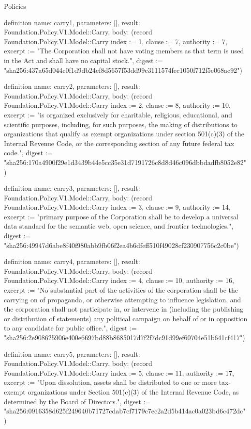 \begin{lexlean}{Policies}
\begin{semanticmodule}
definition{
  name: carry1,
  parameters: [],
  result: Foundation.Policy.V1.Model::Carry,
  body: (record Foundation.Policy.V1.Model::Carry {index := 1, clause := 7, authority := 7, excerpt := "The Corporation shall not have voting members as that term is used in the Act and shall have no capital stock.", digest := "sha256:437a65d044c0f1d9db24ef8d5657f53dd99c3111574fec1050f712f5e068ac92"})
}

definition{
  name: carry2,
  parameters: [],
  result: Foundation.Policy.V1.Model::Carry,
  body: (record Foundation.Policy.V1.Model::Carry {index := 2, clause := 8, authority := 10, excerpt := "is organized exclusively for charitable, religious, educational, and scientific purposes, including, for such purposes, the making of distributions to organizations that qualify as exempt organizations under section 501(c)(3) of the Internal Revenue Code, or the corresponding section of any future federal tax code.", digest := "sha256:170a4900f29e1d3439b44e5cc35e31d7191726c8d8d46c096dbbdadfb8052e82"})
}

definition{
  name: carry3,
  parameters: [],
  result: Foundation.Policy.V1.Model::Carry,
  body: (record Foundation.Policy.V1.Model::Carry {index := 3, clause := 9, authority := 14, excerpt := "primary purpose of the Corporation shall be to develop a universal data standard for the semantic web, open science, and frontier technologies.", digest := "sha256:49947d6abe8f40f980abb9fb06f2ea4b6dfeff510f49028cf230907756c2c0be"})
}

definition{
  name: carry4,
  parameters: [],
  result: Foundation.Policy.V1.Model::Carry,
  body: (record Foundation.Policy.V1.Model::Carry {index := 4, clause := 10, authority := 16, excerpt := "No substantial part of the activities of the corporation shall be the carrying on of propaganda, or otherwise attempting to influence legislation, and the corporation shall not participate in, or intervene in (including the publishing or distribution of statements) any political campaign on behalf of or in opposition to any candidate for public office.", digest := "sha256:2e908625906e400e6697bd88b8685017d7f2f7dc91d99ef60704e51b641cf417"})
}

definition{
  name: carry5,
  parameters: [],
  result: Foundation.Policy.V1.Model::Carry,
  body: (record Foundation.Policy.V1.Model::Carry {index := 5, clause := 11, authority := 17, excerpt := "Upon dissolution, assets shall be distributed to one or more tax-exempt organizations under Section 501(c)(3) of the Internal Revenue Code, as determined by the Board of Directors.", digest := "sha256:0916358d625f249640b71727cdab7cf7179c7ec2a2d5b414ac0a023bd6c472dc"})
}


\end{semanticmodule}
\end{lexlean}
